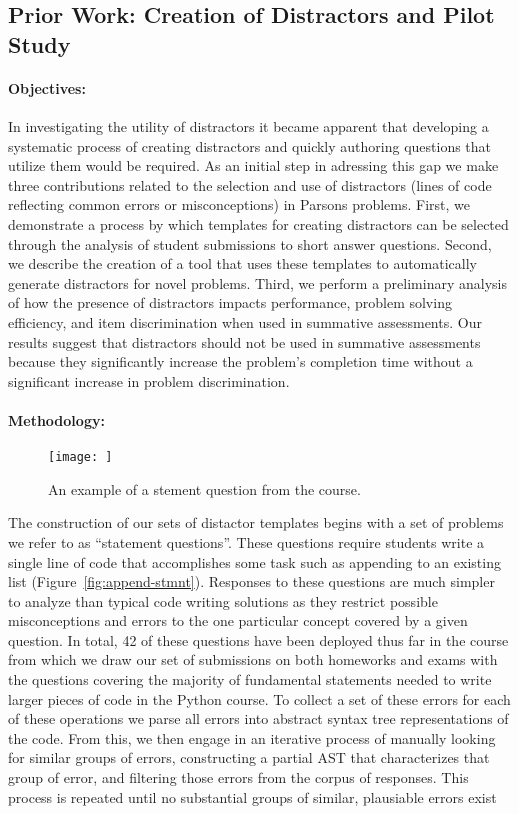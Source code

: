 \documentclass[]{acmart}
\begin{document}
\subsection{Prior Work: Creation of Distractors and Pilot Study}\label{sec:creation}

\paragraph{Objectives:} In investigating the utility of distractors it became 
apparent that developing a systematic process of creating distractors and 
quickly authoring questions that utilize them would be required. As an initial 
step in adressing this gap we make three contributions related to the
selection and use of distractors (lines of code reflecting common errors or
misconceptions) in Parsons problems. First, we demonstrate a process by which
templates for creating distractors can be selected through the analysis of
student submissions to short answer questions. Second, we describe the creation
of a tool that uses these templates to automatically generate distractors for
novel problems. Third, we perform a preliminary analysis of how the presence of
distractors impacts performance, problem solving efficiency, and item
discrimination when used in summative assessments. Our results suggest that
distractors should not be used in summative assessments because they
significantly increase the problem's completion time without a significant
increase in problem discrimination.

\paragraph{Methodology:}

\begin{figure}
  \centering
  \texttt{[image: ]}
  \caption{An example of a stement question from the course.} 
  \label{fig:}
\end{figure}

The construction of our sets of distactor templates begins with a set of
problems we refer to as ``statement questions''. These questions require students
write a single line of code that accomplishes some task such as appending to an
existing list (Figure~\ref{fig:append-stmnt}). Responses to these questions are
much simpler to analyze than typical code writing solutions as they restrict
possible misconceptions and errors to the one particular concept covered by a
given question.  In total, 42 of these questions have been deployed thus far in
the course from which we draw our set of submissions on both homeworks and exams
with the questions covering the majority of fundamental statements needed to
write larger pieces of code in the Python course. To collect a set of these 
errors for each of these operations we parse all errors into abstract syntax
tree representations of the code. From this, we then engage in an iterative 
process of manually looking for similar groups of errors, constructing a 
partial AST that characterizes that group of error, and filtering those errors
from the corpus of responses. This process is repeated until no substantial
groups of similar, plausiable errors exist
\end{document}
